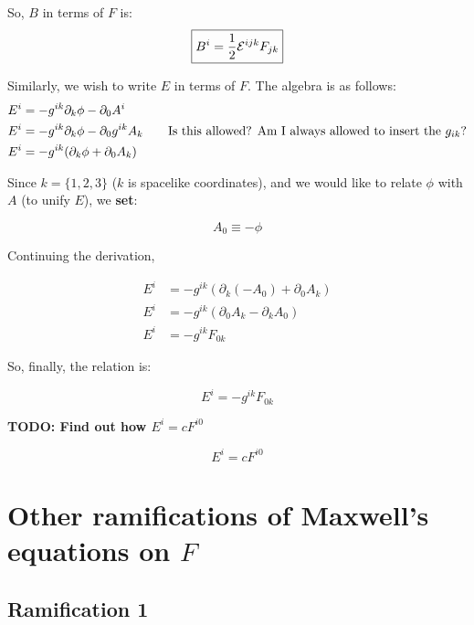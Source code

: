 So, $B$ in terms of $F$ is:
\begin{equation}
    \boxed{B^i = \frac{1}{2} \mathcal{E}^{ijk} F_{jk}}
\end{equation}

Similarly, we wish to write $E$ in terms of $F$. The algebra is as follows:
\begin{align*}
    E^i &= -g^{ik} \partial_k \phi - \partial_0 A^i \\
    E^i &= -g^{ik} \partial_k \phi - \partial_0 g^{ik} A_k  \tag*{Is this allowed? Am I always allowed to insert the $g_{ik}$?} \\
    E^i &= -g^{ik} (\partial_k \phi + \partial_0 A_k) \\
\end{align*}

Since $k = \{1, 2, 3\}$ ($k$ is spacelike coordinates), and we would like to
relate $\phi$ with $A$ (to unify $E$), we \textbf{set}:

\begin{equation}
    \boxed{A_0 \equiv - \phi}
\end{equation}

Continuing the derivation,



\begin{align*}
    E^i &= -g^{ik} (\partial_k (- A_0) + \partial_0 A_k) \\
    E^i &= -g^{ik} (\partial_0 A_k - \partial_k A_0 ) \\
    E^i &= -g^{ik} F_{0k}
\end{align*}


So, finally, the relation is:

\begin{equation}
    \boxed{E^i = -g^{ik} F_{0k}}
\end{equation}

\textbf{TODO: Find out how $E^i = c F^{i0}$}


\begin{equation}
    \boxed{E^i = c F^{i0}}
\end{equation}

\section{Other ramifications of Maxwell's equations on $F$}

\subsection{Ramification 1}
